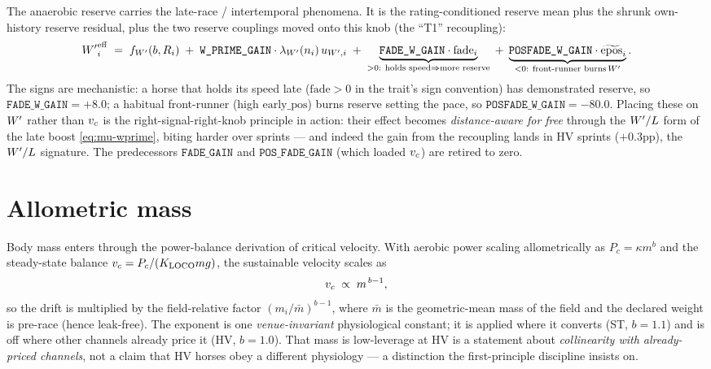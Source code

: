 The anaerobic reserve carries the late-race / intertemporal phenomena. It is the
rating-conditioned reserve mean plus the shrunk own-history reserve residual, plus the two
reserve couplings moved onto this knob (the ``T1'' recoupling):
\begin{equation}
  \Wp^{\mathrm{eff}}_i \;=\;
   f_{\Wp}(b,R_i)
   \;+\; \texttt{W\_PRIME\_GAIN}\cdot\lambda_{\Wp}(n_i)\,u_{\Wp,i}
   \;+\; \underbrace{\texttt{FADE\_W\_GAIN}\cdot\mathrm{fade}_i}_{>0:\ \text{holds speed}\Rightarrow\text{more reserve}}
   \;+\; \underbrace{\texttt{POSFADE\_W\_GAIN}\cdot\widetilde{\mathrm{epos}}_i}_{<0:\ \text{front-runner burns}\,\Wp}.
  \label{eq:wp-eff}
\end{equation}
The signs are mechanistic: a horse that holds its speed late ($\mathrm{fade}>0$ in the trait's
sign convention) has demonstrated reserve, so $\texttt{FADE\_W\_GAIN}=+8.0$; a habitual
front-runner (high $\mathrm{early\_pos}$) burns reserve setting the pace, so
$\texttt{POSFADE\_W\_GAIN}=-80.0$. Placing these on ${W^{\prime}}$ rather than ${v_{c}}$ is the
right-signal-right-knob principle in action: their effect becomes \emph{distance-aware for free}
through the ${W^{\prime}}/L$ form of the late boost \eqref{eq:mu-wprime}, biting harder over sprints --- and
indeed the gain from the recoupling lands in HV sprints ($+0.3$pp), the ${W^{\prime}}/L$ signature. The
predecessors $\texttt{FADE\_GAIN}$ and $\texttt{POS\_FADE\_GAIN}$ (which loaded ${v_{c}}$) are retired
to zero.

\section{Allometric mass}
\label{sec:allo}

Body mass enters through the power-balance derivation of critical velocity. With aerobic power
scaling allometrically as $P_c = \kappa m^{b}$ and the steady-state balance
${v_{c}} = P_c/(K_{\text{LOCO}} m g)$, the sustainable velocity scales as
\begin{equation}
  {v_{c}} \;\propto\; m^{\,b-1},
  \label{eq:allo}
\end{equation}
so the drift is multiplied by the field-relative factor $(m_i/\bar m)^{b-1}$, where $\bar m$ is the
geometric-mean mass of the field and the declared weight is pre-race (hence leak-free). The
exponent is one \emph{venue-invariant} physiological constant; it is applied where it converts
(ST, $b=1.1$) and is off where other channels already price it (HV, $b=1.0$). That mass is
low-leverage at HV is a statement about \emph{collinearity with already-priced channels}, not a
claim that HV horses obey a different physiology --- a distinction the first-principle discipline
insists on.

